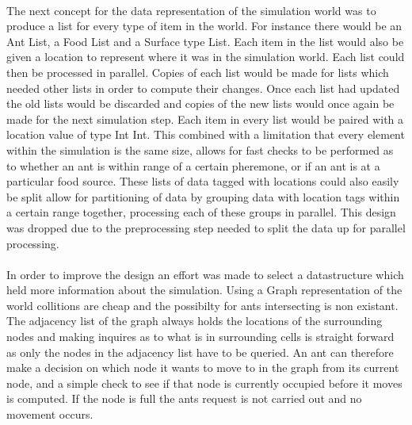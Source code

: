 \documentclass[main.tex]{subfiles}
\begin{document}
\paragraph{}The next concept for the data representation of the simulation world was to produce a list for every type of item in the world. For instance there would be an Ant List, a Food List and a Surface type List. Each item in the list would also be given a location to represent where it was in the simulation world. Each list could then be processed in parallel. Copies of each list would be made for lists which needed other lists in order to compute their changes. Once each list had updated the old lists would be discarded and  copies of the new lists would once again be made for the next simulation step.‎ Each item in every list would be paired with a location value of type Int Int. This combined with a limitation that every element within the simulation is the same size, allows for fast checks to be performed as to whether an ant is within range of a certain pheremone, or if an ant is at a particular food source. These lists of data tagged with locations could also easily be split allow for partitioning of data by grouping data with location tags within a certain range together, processing each of these groups in parallel. This design was dropped due to the preprocessing step needed to split the data up for parallel processing.

\paragraph{}In order to improve the design an effort was made to select a datastructure which held more information about the simulation. Using a Graph representation of the world collitions are cheap and the possibilty for ants intersecting is non existant. The adjacency list of the graph always holds the locations of the surrounding nodes and making inquires as to what is in surrounding cells is straight forward as only the nodes in the adjacency list have to be queried. An ant can therefore make a decision on which node it wants to move to in the graph from its current node, and a simple check to see if that node is currently occupied before it moves is computed. If the node is full the ants request is not carried out and no movement occurs.

\end{document}

